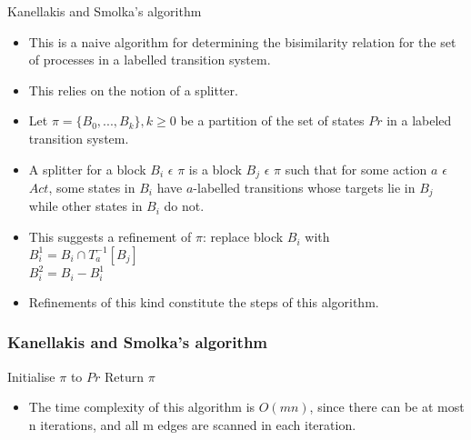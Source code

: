 \documentclass{beamer}
\begin{document}
\begin{frame}{Kanellakis and Smolka's algorithm}
  \begin{itemize}
  \item This is a naive algorithm for determining the bisimilarity
    relation for the set of processes in a labelled transition system.
  \item This relies on the notion of a splitter.
  \item Let $\pi = \{ B_0, ..., B_k \}, k \ge 0$ be a partition of the
    set of states $Pr$ in a labeled transition system.
  \item A splitter for a block $B_i$ $\epsilon$ $\pi$ is a block $B_j$
    $\epsilon$ $\pi$ such that for some action $a$ $\epsilon$ $Act$, some
    states in $B_i$ have $a$-labelled transitions whose targets lie in
    $B_j$ while other states in $B_i$ do not.
  \item This suggests a refinement of $\pi$: replace block $B_i$ with
    \\
    $B_i^1 = B_i \cap T_a^{-1}[B_j] $ \\
    $B_i^2 = B_i - B_i^1 $
  \item Refinements of this kind constitute the steps of this
    algorithm.
  \end{itemize}
\end{frame}

\begin{frame}[fragile]

  \frametitle{Kanellakis and Smolka's algorithm}

  \begin{algorithm2e}[H]
    Initialise $\pi$ to ${Pr}$\;
    Return $\pi$\;
\end{algorithm2e}

  \begin{itemize}
  \item The time complexity of this algorithm is $O(mn)$, since there
    can be at most n iterations, and all m edges are scanned in each iteration.
  \end{itemize}

\end{frame}

\end{document}
